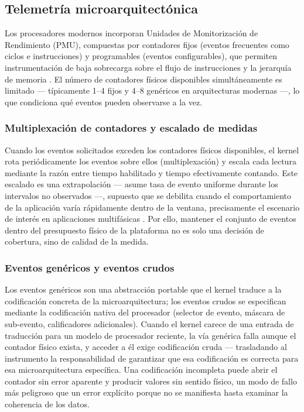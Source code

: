 \documentclass[12pt,oneside,spanish]{book}
\begin{document}
\subsection{Telemetría microarquitectónica}

Los procesadores modernos incorporan Unidades de Monitorización de Rendimiento (PMU), compuestas por contadores fijos (eventos frecuentes como ciclos e instrucciones) y programables (eventos configurables), que permiten instrumentación de baja sobrecarga sobre el flujo de instrucciones y la jerarquía de memoria \cite{Liu2024}. El número de contadores físicos disponibles simultáneamente es limitado --- típicamente 1--4 fijos y 4--8 genéricos en arquitecturas modernas \cite{Liu2024} ---, lo que condiciona qué eventos pueden observarse a la vez.

\subsubsection{Multiplexación de contadores y escalado de medidas}
\label{sec:multiplexacion}

Cuando los eventos solicitados exceden los contadores físicos disponibles, el kernel rota periódicamente los eventos sobre ellos (multiplexación) y escala cada lectura mediante la razón entre tiempo habilitado y tiempo efectivamente contando. Este escalado es una extrapolación --- asume tasa de evento uniforme durante los intervalos no observados ---, supuesto que se debilita cuando el comportamiento de la aplicación varía rápidamente dentro de la ventana, precisamente el escenario de interés en aplicaciones multifásicas \cite{Liu2024}. Por ello, mantener el conjunto de eventos dentro del presupuesto físico de la plataforma no es solo una decisión de cobertura, sino de calidad de la medida.

\subsubsection{Eventos genéricos y eventos crudos}

Los eventos genéricos son una abstracción portable que el kernel traduce a la codificación concreta de la microarquitectura; los eventos crudos se especifican mediante la codificación nativa del procesador (selector de evento, máscara de sub-evento, calificadores adicionales). Cuando el kernel carece de una entrada de traducción para un modelo de procesador reciente, la vía genérica falla aunque el contador físico exista, y acceder a él exige codificación cruda --- trasladando al instrumento la responsabilidad de garantizar que esa codificación es correcta para esa microarquitectura específica. Una codificación incompleta puede abrir el contador sin error aparente y producir valores sin sentido físico, un modo de fallo más peligroso que un error explícito porque no se manifiesta hasta examinar la coherencia de los datos.
\end{document}
